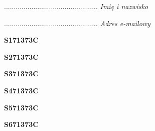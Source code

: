 \begin{turn}{90}\begin{minipage}{\linewidth} \vspace{20mm} ................................................  \textit{Imię i nazwisko}\end{minipage}\end{turn}

\begin{turn}{90}\begin{minipage}{\linewidth} \vspace{20mm} ................................................  \textit{Adres e-mailowy}\end{minipage}\end{turn}

\begin{turn}{90}\huge \begin{minipage}{\linewidth} \vspace{10mm}\textbf{S171373C}\end{minipage}\end{turn}

\begin{turn}{90}\huge \begin{minipage}{\linewidth} \vspace{10mm}\textbf{S271373C}\end{minipage}\end{turn}

\begin{turn}{90}\huge \begin{minipage}{\linewidth} \vspace{10mm}\textbf{S371373C}\end{minipage}\end{turn}

\begin{turn}{90}\huge \begin{minipage}{\linewidth} \vspace{10mm}\textbf{S471373C}\end{minipage}\end{turn}

\begin{turn}{90}\huge \begin{minipage}{\linewidth} \vspace{10mm}\textbf{S571373C}\end{minipage}\end{turn}

\begin{turn}{90}\huge \begin{minipage}{\linewidth} \vspace{10mm}\textbf{S671373C}\end{minipage}\end{turn}

